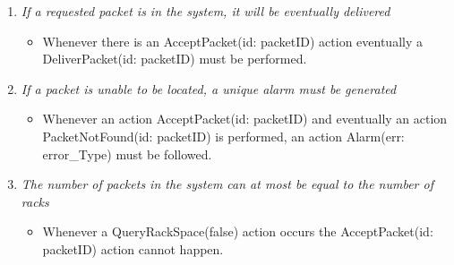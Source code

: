 \begin{enumerate}
\item \textit{If a requested packet is in the system, it will be
	eventually delivered}
	\begin{itemize}
	\item Whenever there is an AcceptPacket(id: packetID) action 
	eventually a DeliverPacket(id: packetID) must be performed.  
	\end{itemize}
	
\item \textit{If a packet is unable to be located, a unique alarm must 
	be generated}
	\begin{itemize}	
	\item  Whenever an action AcceptPacket(id: packetID) and eventually 
	an action PacketNotFound(id: packetID) is performed, an action 
	Alarm(err: error\_Type) must be followed.
	\end{itemize}
		
\item \textit{The number of packets in the system can at most be equal to the number of racks}
	\begin{itemize}
	\item Whenever a QueryRackSpace(false) action occurs the
	AcceptPacket(id: packetID) action cannot happen. 
	\end{itemize}
\end{enumerate}
